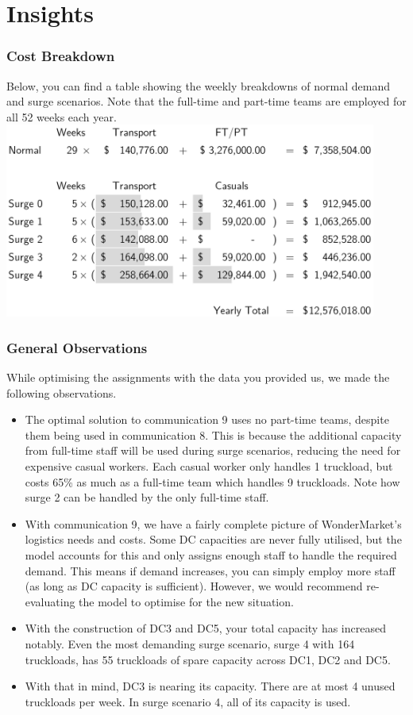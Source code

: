 \documentclass[11pt,a4paper]{article}
\begin{document}
\newpage
\part{Insights}
\section{Cost Breakdown}
Below, you can find a table showing the weekly breakdowns of normal 
demand and surge scenarios. Note that the full-time and part-time 
teams are employed for all 52 weeks each year. \\
\includegraphics[width=33em]{table.PNG}

\section{General Observations}
While optimising the assignments with the data you provided us, we made 
the following observations.
\begin{itemize}
    \item The optimal solution to communication 9 uses no part-time teams, despite 
    them being used in communication 8. This is because the additional 
    capacity from full-time staff will be used during surge
     scenarios, reducing the need for expensive casual workers. Each casual worker only 
     handles 1 truckload, but costs 65\% as much as a full-time team which handles 
     9 truckloads. Note how 
     surge 2 can be handled by the only full-time staff.
    \item With communication 9, we have a fairly complete picture of WonderMarket's
    logistics needs and costs. Some DC capacities are never fully utilised, 
    but the model accounts for this and only assigns enough staff to handle 
    the required demand. This means if demand increases, you can simply employ more 
    staff (as long as DC capacity is sufficient). However, we would recommend
    re-evaluating the model to optimise for the new situation.
    \item With the construction of DC3 and DC5, your total capacity has increased 
    notably. Even the most demanding surge scenario, surge 4 with 164 truckloads,
    has 55 truckloads of spare capacity across DC1, DC2 and DC5.
    \item With that in mind, DC3 is nearing its capacity. There are at most  
    4 unused truckloads per week. In surge scenario 4, all of its 
    capacity is used. 
\end{itemize}
\end{document}
